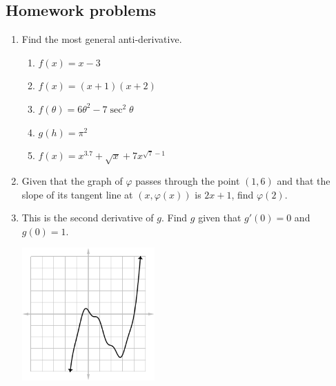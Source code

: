 \subsection{Homework problems}
\begin{enumerate}
  \item Find the most general anti-derivative.
    \begin{enumerate}
      \item $ f(x) = x - 3 $
      \item $ f(x) = (x + 1)(x + 2) $
      \item $ f(\theta) = 6\theta^2 - 7 \sec^2 \theta $
      \item $ g(h) = \pi^2 $
      \item $ f(x) = x^{3.7} + \sqrt{x} + 7x^{\sqrt{7} - 1} $
    \end{enumerate}
  \item Given that the graph of $ \varphi $ passes through the point $ (1, 6) $
        and that the slope of its tangent line at $ (x, \varphi(x)) $ is $ 2x + 1 $,
        find $ \varphi(2) $.
  \item This is the second derivative of $ g $. Find $ g $ given that $ g'(0) = 0 $ and $ g(0) = 1 $.
        \begin{center}
          \includegraphics[width=0.4\textwidth]{anti7}
        \end{center}
\end{enumerate}
